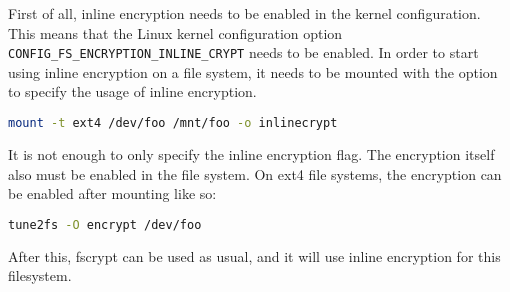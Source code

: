 First of all, inline encryption needs to be enabled in the kernel configuration. This means that the Linux kernel configuration option \verb|CONFIG_FS_ENCRYPTION_INLINE_CRYPT| needs to be enabled.
In order to start using inline encryption on a file system, it needs to be mounted with the option to specify the usage of inline encryption.
\begin{lstlisting}[language=bash]
mount -t ext4 /dev/foo /mnt/foo -o inlinecrypt
\end{lstlisting}
It is not enough to only specify the inline encryption flag. The encryption itself also must be enabled in the file system. On ext4 file systems, the encryption can be enabled after mounting like so:
\begin{lstlisting}[language=bash]
tune2fs -O encrypt /dev/foo
\end{lstlisting}
After this, fscrypt can be used as usual, and it will use inline encryption for this filesystem.








